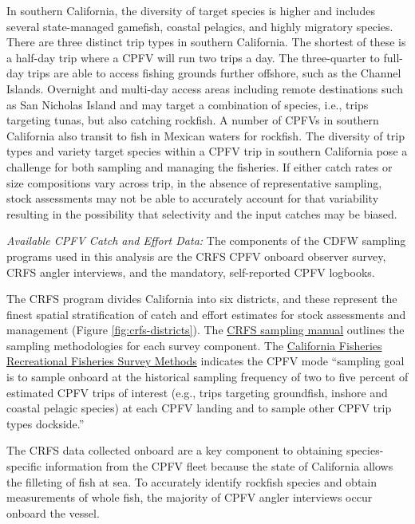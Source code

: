 \documentclass[11pt,
  letterpaper,
]{article}
\begin{document}
In southern California, the diversity of target species is higher and includes several state-managed gamefish, coastal pelagics, and highly migratory species. There are three distinct trip types in southern California. The shortest of these is a half-day trip where a CPFV will run two trips a day. The three-quarter to full-day trips are able to access fishing grounds further offshore, such as the Channel Islands. Overnight and multi-day access areas including remote destinations such as San Nicholas Island and may target a combination of species, i.e., trips targeting tunas, but also catching rockfish. A number of CPFVs in southern California also transit to fish in Mexican waters for rockfish. The diversity of trip types and variety target species within a CPFV trip in southern California pose a challenge for both sampling and managing the fisheries. If either catch rates or size compositions vary across trip, in the absence of representative sampling, stock assessments may not be able to accurately account for that variability resulting in the possibility that selectivity and the input catches may be biased.

\emph{Available CPFV Catch and Effort Data:} The components of the CDFW sampling programs used in this analysis are the CRFS CPFV onboard observer survey, CRFS angler interviews, and the mandatory, self-reported CPFV logbooks.

The CRFS program divides California into six districts, and these represent the finest spatial stratification of catch and effort estimates for stock assessments and management (Figure \ref{fig:crfs-districts}). The \href{https://nrm.dfg.ca.gov/FileHandler.ashx?DocumentID=62348&inline}{CRFS sampling manual} outlines the sampling methodologies for each survey component. The \href{https://nrm.dfg.ca.gov/FileHandler.ashx?DocumentID=36136&inline}{California Fisheries Recreational Fisheries Survey Methods} indicates the CPFV mode ``sampling goal is to sample onboard at the historical sampling frequency of two to five percent of estimated CPFV trips of interest (e.g., trips targeting groundfish, inshore and coastal pelagic species) at each CPFV landing and to sample other CPFV trip types dockside.''

The CRFS data collected onboard are a key component to obtaining species-specific information from the CPFV fleet because the state of California allows the filleting of fish at sea. To accurately identify rockfish species and obtain measurements of whole fish, the majority of CPFV angler interviews occur onboard the vessel.
\end{document}
